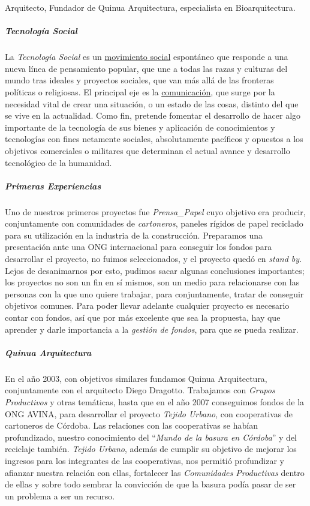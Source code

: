 \documentclass[
]{article}
\begin{document}
Arquitecto, Fundador de Quinua Arquitectura, especialista en
Bioarquitectura.

\hypertarget{tecnologuxeda-social}{%
\subparagraph{\texorpdfstring{\textbf{Tecnología
Social}}{Tecnología Social}}\label{tecnologuxeda-social}}

La \emph{Tecnología Social} es un
\href{https://es.wikipedia.org/wiki/Movimiento_social}{movimiento
social} espontáneo que responde a una nueva línea de pensamiento
popular, que une a todas las razas y culturas del mundo tras ideales y
proyectos sociales, que van más allá de las fronteras políticas o
religiosas. El principal eje es la
\href{https://es.wikipedia.org/wiki/Comunicaci\%C3\%B3n}{comunicación},
que surge por la necesidad vital de crear una situación, o un estado de
las cosas, distinto del que se vive en la actualidad. Como fin, pretende
fomentar el desarrollo de hacer algo importante de la tecnología de sus
bienes y aplicación de conocimientos y tecnologías con fines netamente
sociales, absolutamente pacíficos y opuestos a los objetivos comerciales
o militares que determinan el actual avance y desarrollo tecnológico de
la humanidad.

\hypertarget{primeras-experiencias}{%
\subparagraph{\texorpdfstring{\textbf{Primeras
Experiencias}}{Primeras Experiencias}}\label{primeras-experiencias}}

Uno de nuestros primeros proyectos fue \emph{Prensa\_Papel} cuyo
objetivo era producir, conjuntamente con comunidades de
\emph{cartoneros}, paneles rígidos de papel reciclado para su
utilización en la industria de la construcción. Preparamos una
presentación ante una ONG internacional para conseguir los fondos para
desarrollar el proyecto, no fuimos seleccionados, y el proyecto quedó en
\emph{stand by}. Lejos de desanimarnos por esto, pudimos sacar algunas
conclusiones importantes; los proyectos no son un fin en sí mismos, son
un medio para relacionarse con las personas con la que uno quiere
trabajar, para conjuntamente, tratar de conseguir objetivos comunes.
Para poder llevar adelante cualquier proyecto es necesario contar con
fondos, así que por más excelente que sea la propuesta, hay que aprender
y darle importancia a la \emph{gestión de fondos}, para que se pueda
realizar.

\hypertarget{quinua-arquitectura}{%
\subparagraph{Quinua Arquitectura}\label{quinua-arquitectura}}

En el año 2003, con objetivos similares fundamos Quinua Arquitectura,
conjuntamente con el arquitecto Diego Dragotto. Trabajamos con
\emph{Grupos Productivos} y otras temáticas, hasta que en el año 2007
conseguimos fondos de la ONG AVINA, para desarrollar el proyecto
\emph{Tejido Urbano}, con cooperativas de cartoneros de Córdoba. Las
relaciones con las cooperativas se habían profundizado, nuestro
conocimiento del ``\emph{Mundo de la basura en Córdoba}'' y del
reciclaje también. \emph{Tejido Urbano}, además de cumplir su objetivo
de mejorar los ingresos para los integrantes de las cooperativas, nos
permitió profundizar y afianzar nuestra relación con ellas, fortalecer
las \emph{Comunidades Productivas} dentro de ellas y sobre todo sembrar
la convicción de que la basura podía pasar de ser un problema a ser un
recurso.
\end{document}
